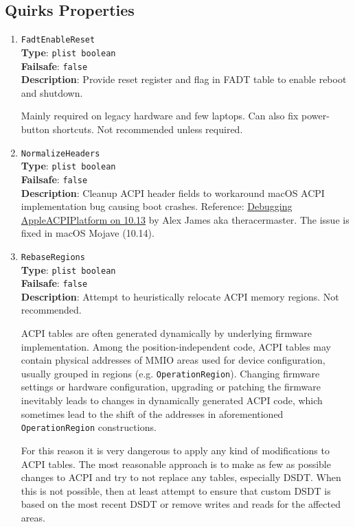 \documentclass[]{article}
\begin{document}
\subsection{Quirks Properties}\label{acpipropsquirks}

\begin{enumerate}

\item
  \texttt{FadtEnableReset}\\
  \textbf{Type}: \texttt{plist\ boolean}\\
  \textbf{Failsafe}: \texttt{false}\\
  \textbf{Description}: Provide reset register and flag in FADT table to enable
  reboot and shutdown.

  Mainly required on legacy hardware and few laptops. Can also fix power-button
  shortcuts. Not recommended unless required.

\item
  \texttt{NormalizeHeaders}\\
  \textbf{Type}: \texttt{plist\ boolean}\\
  \textbf{Failsafe}: \texttt{false}\\
  \textbf{Description}: Cleanup ACPI header fields to workaround macOS
  ACPI implementation bug causing boot crashes. Reference:
  \href{https://alextjam.es/debugging-appleacpiplatform/}{Debugging
  AppleACPIPlatform on 10.13} by Alex James aka theracermaster. The
  issue is fixed in macOS Mojave (10.14).

\item
  \texttt{RebaseRegions}\\
  \textbf{Type}: \texttt{plist\ boolean}\\
  \textbf{Failsafe}: \texttt{false}\\
  \textbf{Description}: Attempt to heuristically relocate ACPI memory
  regions. Not recommended.

  ACPI tables are often generated dynamically by underlying firmware
  implementation. Among the position-independent code, ACPI tables may
  contain physical addresses of MMIO areas used for device
  configuration, usually grouped in regions (e.g.
  \texttt{OperationRegion}). Changing firmware settings or hardware
  configuration, upgrading or patching the firmware inevitably leads to
  changes in dynamically generated ACPI code, which sometimes lead to
  the shift of the addresses in aforementioned \texttt{OperationRegion}
  constructions.

  For this reason it is very dangerous to apply any kind of
  modifications to ACPI tables. The most reasonable approach is to make
  as few as possible changes to ACPI and try to not replace any tables,
  especially DSDT. When this is not possible, then at least attempt to
  ensure that custom DSDT is based on the most recent DSDT or remove
  writes and reads for the affected areas.


\end{enumerate}
\end{document}
